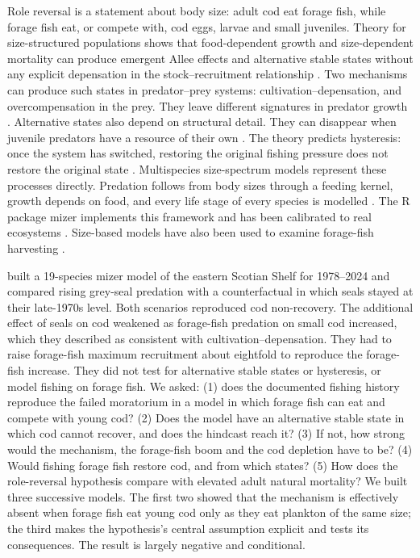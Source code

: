 \documentclass[12pt,letterpaper,fleqn]{article}
\begin{document}
Role reversal is a statement about body size: adult cod eat forage fish, while forage fish eat, or compete with, cod eggs, larvae and small juveniles. Theory for size-structured populations shows that food-dependent growth and size-dependent mortality can produce emergent Allee effects and alternative stable states without any explicit depensation in the stock--recruitment relationship \autocite{deroos2002size,deroos2003influence}. Two mechanisms can produce such states in predator--prey systems: cultivation--depensation, and overcompensation in the prey. They leave different signatures in predator growth \autocite{gardmark2015regime}. Alternative states also depend on structural detail. They can disappear when juvenile predators have a resource of their own \autocite{vanleeuwen2013predators}. The theory predicts hysteresis: once the system has switched, restoring the original fishing pressure does not restore the original state \autocite{scheffer2001catastrophic}. Multispecies size-spectrum models represent these processes directly. Predation follows from body sizes through a feeding kernel, growth depends on food, and every life stage of every species is modelled \autocite{hartvig2011food}. The R package mizer implements this framework \autocite{scott2014mizer} and has been calibrated to real ecosystems \autocite{blanchard2014evaluating}. Size-based models have also been used to examine forage-fish harvesting \autocite{houle2013emerging}.

\textcite{adekoya2026reexamining} built a 19-species mizer model of the eastern Scotian Shelf for 1978--2024 and compared rising grey-seal predation with a counterfactual in which seals stayed at their late-1970s level. Both scenarios reproduced cod non-recovery. The additional effect of seals on cod weakened as forage-fish predation on small cod increased, which they described as consistent with cultivation--depensation. They had to raise forage-fish maximum recruitment about eightfold to reproduce the forage-fish increase. They did not test for alternative stable states or hysteresis, or model fishing on forage fish. We asked: (1) does the documented fishing history reproduce the failed moratorium in a model in which forage fish can eat and compete with young cod? (2) Does the model have an alternative stable state in which cod cannot recover, and does the hindcast reach it? (3) If not, how strong would the mechanism, the forage-fish boom and the cod depletion have to be? (4) Would fishing forage fish restore cod, and from which states? (5) How does the role-reversal hypothesis compare with elevated adult natural mortality? We built three successive models. The first two showed that the mechanism is effectively absent when forage fish eat young cod only as they eat plankton of the same size; the third makes the hypothesis's central assumption explicit and tests its consequences. The result is largely negative and conditional.
\end{document}

